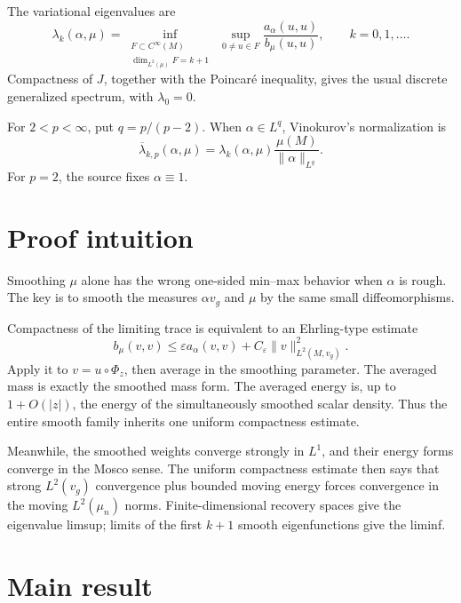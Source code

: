 \documentclass[11pt]{article}
\newcommand{\Ltwo}{L^2(M,v_g)}
\begin{document}
The variational eigenvalues are
\[
 \lambda_k(\alpha,\mu)=
 \inf_{\substack{F\subset C^\infty(M)\\ \dim_{L^2(\mu)}F=k+1}}
 \ \sup_{0\neq u\in F}\frac{a_\alpha(u,u)}{b_\mu(u,u)},
 \qquad k=0,1,\ldots .
\]
Compactness of \(J\), together with the Poincar\'e inequality, gives the usual
discrete generalized spectrum, with \(\lambda_0=0\).

For \(2<p<\infty\), put \(q=p/(p-2)\).  When
\(\alpha\in L^q\), Vinokurov's normalization is
\[
 \overline\lambda_{k,p}(\alpha,\mu)
 =\lambda_k(\alpha,\mu)\frac{\mu(M)}{\|\alpha\|_{L^q}}.
\]
For \(p=2\), the source fixes \(\alpha\equiv1\).

\section*{Proof intuition}

Smoothing \(\mu\) alone has the wrong one-sided min--max behavior when
\(\alpha\) is rough.  The key is to smooth the measures \(\alpha v_g\) and
\(\mu\) by the same small diffeomorphisms.

Compactness of the limiting trace is equivalent to an Ehrling-type estimate
\[
 b_\mu(v,v)\leq\varepsilon a_\alpha(v,v)
       +C_\varepsilon\|v\|_{\Ltwo}^2.
\]
Apply it to \(v=u\circ\Phi_z\), then average in the smoothing parameter.
The averaged mass is exactly the smoothed mass form.  The averaged energy is,
up to \(1+O(|z|)\), the energy of the simultaneously smoothed scalar density.
Thus the entire smooth family inherits one uniform compactness estimate.

Meanwhile, the smoothed weights converge strongly in \(L^1\), and their
energy forms converge in the Mosco sense.  The uniform compactness estimate
then says that strong \(L^2(v_g)\) convergence plus bounded moving energy
forces convergence in the moving \(L^2(\mu_n)\) norms.  Finite-dimensional
recovery spaces give the eigenvalue limsup; limits of the first \(k+1\)
smooth eigenfunctions give the liminf.

\section*{Main result}
\end{document}
